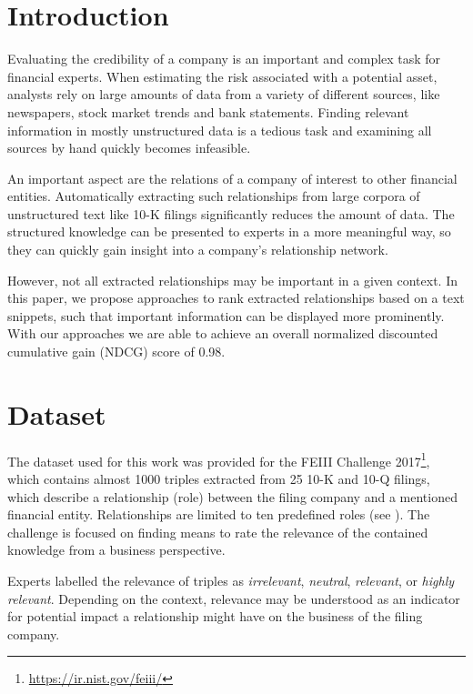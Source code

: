\section{Introduction}

Evaluating the credibility of a company is an important and complex task for financial experts.
When estimating the risk associated with a potential asset, analysts rely on large amounts of data from a variety of different sources, like newspapers, stock market trends and bank statements.
Finding relevant information in mostly unstructured data is a tedious task and examining all sources by hand quickly becomes infeasible.

An important aspect are the relations of a company of interest to other financial entities.
Automatically extracting such relationships from large corpora of unstructured text\cite{entityextraction} like 10-K filings significantly reduces the amount of data.
The structured knowledge can be presented to experts in a more meaningful way, so they can quickly gain insight into a company's relationship network.

However, not all extracted relationships may be important in a given context.
In this paper, we propose approaches to rank extracted relationships based on a text snippets, such that important information can be displayed more prominently.
With our approaches we are able to achieve an overall normalized discounted cumulative gain (NDCG) score of 0.98.

\section{Dataset}
The dataset used for this work was provided for the FEIII Challenge 2017\footnote{\url{https://ir.nist.gov/feiii/}}, which contains almost 1000 triples extracted from 25 10-K and 10-Q filings, which describe a relationship (role) between the filing company and a mentioned financial entity.
Relationships are limited to ten predefined roles (see ).
The challenge is focused on finding means to rate the relevance of the contained knowledge from a business perspective.

Experts labelled the relevance of triples as \textit{irrelevant}, \textit{neutral}, \textit{relevant}, or \textit{highly relevant}.
Depending on the context, relevance may be understood as an indicator for potential impact a relationship might have on the business of the filing company. 

